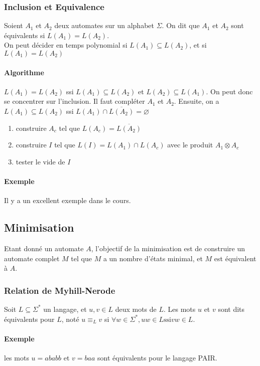 \documentclass[a4paper]{article}
\begin{document}
  \subsubsection{Inclusion et Equivalence}
  Soient $A_1$ et $A_2$ deux automates sur un alphabet $\Sigma$. On dit que
  $A_1$ et $A_2$ sont équivalents si $L(A_1) = L(A_2)$.\\
  On peut décider en temps polynomial si $L(A_1) \subseteq L(A_2)$, et si $L(A_1) = L(A_2)$

  \paragraph{Algorithme}
  $L(A_1) = L(A_2)$ ssi $L(A_1) \subseteq L(A_2)$ et $L(A_2) \subseteq L(A_1)$.
  On peut donc se concentrer sur l'inclusion. Il faut compléter $A_1$ et $A_2$.
  Ensuite, on a $L(A_1) \subseteq L(A_2)$ ssi $L(A_1) \cap \overline{L(A_2)} = \varnothing$
  \begin{enumerate}
    \item construire $A_c$ tel que $L(A_c) = \overline{L(A_2)}$
    \item construire $I$ tel que $L(I) = L(A_1) \cap L(A_c)$ avec le produit $A_1 \otimes A_c$
    \item tester le vide de $I$
  \end{enumerate}

  \paragraph{Exemple} Il y a un excellent exemple dans le cours.


  \subsection{Minimisation}
  Etant donné un automate $A$, l'objectif de la minimisation est de construire un automate
  complet $M$ tel que $M$ a un nombre d'états minimal, et $M$ est équivalent à $A$.

  \subsubsection{Relation de Myhill-Nerode}
  Soit $L \subseteq \Sigma^*$ un langage, et $u,v\in L$ deux mots de $L$.
  Les mots $u$ et $v$ sont dits équivalents pour $L$, noté $u \equiv_L v$ si
  $ \forall w \in \Sigma^*, uw \in L \text{ssi} vw \in L$.

  \paragraph{Exemple} les mots $u=ababb$ et $v=baa$ sont équivalents pour le 
  langage PAIR.
\end{document}
